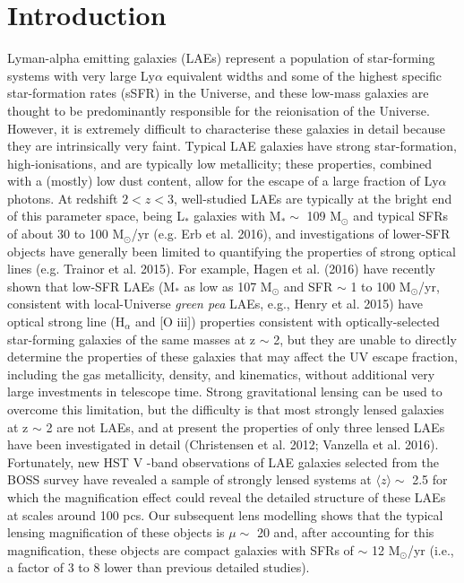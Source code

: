 \documentclass[a4paper,fleqn,usenatbib]{mnras}
\begin{document}
\section{Introduction}
Lyman-alpha emitting galaxies (LAEs) represent a population of star-forming systems with very large Ly$\alpha$ equivalent widths and some of the highest specific star-formation rates (sSFR) in the Universe, and these low-mass galaxies are thought to be predominantly responsible for the reionisation of the Universe. However, it is extremely difficult to characterise these galaxies in detail because they are intrinsically very faint. Typical LAE galaxies have strong star-formation, high-ionisations, and are typically low metallicity; these properties, combined with a (mostly) low dust content, allow for the escape of a large fraction of Ly$\alpha$ photons. At redshift  $2 < z < 3$, well-studied LAEs are typically at the bright end of this parameter space, being  L$_\text{*}$ galaxies with M$_\text{*} \sim$ 109 M$_\odot$ and typical SFRs of about 30 to 100 M$_\odot$/yr (e.g. Erb et al. 2016), and investigations of lower-SFR objects have generally been limited to quantifying the properties of strong optical lines (e.g. Trainor et al. 2015). For example, Hagen et al. (2016) have recently shown that low-SFR LAEs (M$_\text{*}$ as low as 107 M$_\odot$ and SFR $\sim$ 1 to 100 M$_\odot$/yr, consistent with local-Universe \emph{green pea} LAEs, e.g., Henry et al. 2015) have optical strong line (H$_\alpha$ and [O iii]) properties consistent with optically-selected star-forming galaxies of the same masses at z $\sim$ 2, but they are unable to directly determine the properties of these galaxies that may affect the UV escape fraction, including the gas metallicity, density, and kinematics, without additional very large investments in telescope time.
Strong gravitational lensing can be used to overcome this limitation, but the difficulty is that most strongly lensed galaxies at z $\sim$ 2 are not LAEs, and at present the properties of only three lensed LAEs have been investigated in detail (Christensen et al. 2012; Vanzella et al. 2016). Fortunately, new HST V -band observations of LAE galaxies selected from the BOSS survey have revealed a sample of strongly lensed systems at  $\langle z\rangle \sim$ 2.5 for which the magnification effect could reveal the detailed structure of these LAEs at scales around 100 pcs. Our subsequent lens modelling shows that the typical lensing magnification of these objects is $\mu \sim$ 20 and, after accounting for this magnification, these objects are compact galaxies with SFRs of $\sim$ 12 M$_\odot$/yr (i.e., a factor of 3 to 8 lower than previous detailed studies).
\end{document}
